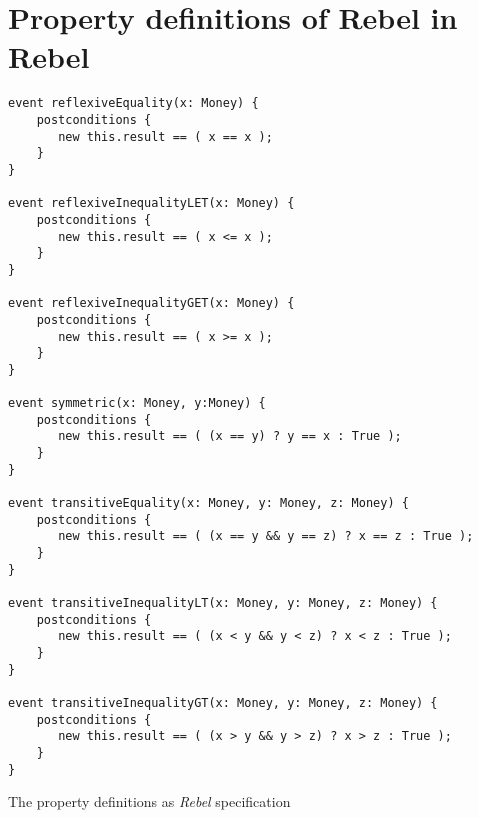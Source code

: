 %



\appendix
\chapter{Property definitions of Rebel in Rebel}
\label{app:a_event_definitions}
\begin{sourcecode}[!ht]
\begin{lstlisting}[language=Rebel]
event reflexiveEquality(x: Money) {
    postconditions {
       new this.result == ( x == x );
    }
}

event reflexiveInequalityLET(x: Money) {
    postconditions {
       new this.result == ( x <= x );
    }
}

event reflexiveInequalityGET(x: Money) {
    postconditions {
       new this.result == ( x >= x );
    }
}

event symmetric(x: Money, y:Money) {
    postconditions {
       new this.result == ( (x == y) ? y == x : True );
    }
}

event transitiveEquality(x: Money, y: Money, z: Money) {
    postconditions {
       new this.result == ( (x == y && y == z) ? x == z : True );
    }
}

event transitiveInequalityLT(x: Money, y: Money, z: Money) {
    postconditions {
       new this.result == ( (x < y && y < z) ? x < z : True );
    }
}

event transitiveInequalityGT(x: Money, y: Money, z: Money) {
    postconditions {
       new this.result == ( (x > y && y > z) ? x > z : True );
    }
}
\end{lstlisting}
\caption{The property definitions as \textit{Rebel} specification}
\end{sourcecode}
\FloatBarrier
